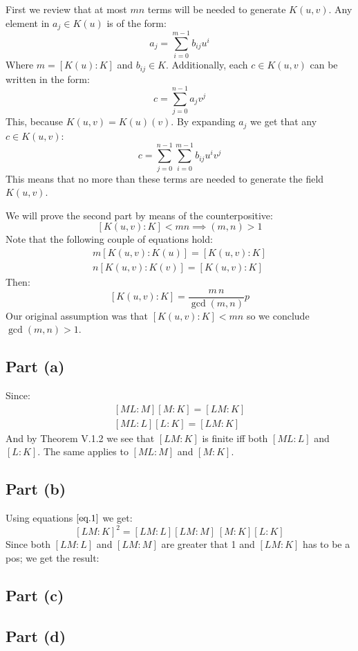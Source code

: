 First we review that at most $mn$ terms will be needed to generate $K(u,v)$.
Any element in $a_j\in K(u)$ is of the form:
$$a_j = \sum_{i=0}^{m-1} b_{ij} u^i$$
Where $m=[K(u):K]$ and $b_{ij}\in K$. 
Additionally, each $c\in K(u,v)$ can be written in the form:
$$c= \sum_{j=0}^{n-1} a_{j} v^j$$
This, because $K(u,v)= K(u)(v)$. By expanding $a_j$ we get that any $c\in K(u,v)$:
$$c= \sum_{j=0}^{n-1} \sum_{i=0}^{m-1} b_{ij} u^i v^j$$
This means that no more than these terms are needed to generate the field $K(u,v)$.

We will prove the second part by means of the counterpositive: 
$$[K(u,v):K]<mn \implies (m,n)>1$$ 
Note that the following couple of equations hold:
\begin{gather*}
m[K(u,v):K(u)] = [K(u,v):K]\\
n[K(u,v):K(v)] = [K(u,v):K]
\end{gather*}
Then:
$$[K(u,v):K] = \frac{m\, n}{\gcd(m,n)}p$$
Our original assumption was that $[K(u,v):K]<mn$ so we conclude $\gcd(m,n)>1$. 

\subsection*{Part (a)}
Since:
\begin{gather} \label{eq.1}
    [ML:M][M:K] = [LM:K]\\
    [ML:L][L:K] = [LM:K]
\end{gather}
And by Theorem V.1.2 we see that $[LM:K]$ is finite iff both $[ML:L]$ and $[L:K]$.
The same applies to $[ML:M]$ and $[M:K]$. 

\subsection*{Part (b)}
Using equations $\ref{eq.1}$ we get:
    $$[LM: K]^2= [LM:L][LM:M] \ [M:K][L:K]$$
    Since both $[LM:L]$ and $[LM:M]$ are greater that 1 and $[LM:K]$ has to be a pos; we get the result:
\subsection*{Part (c)}
\subsection*{Part (d)}
